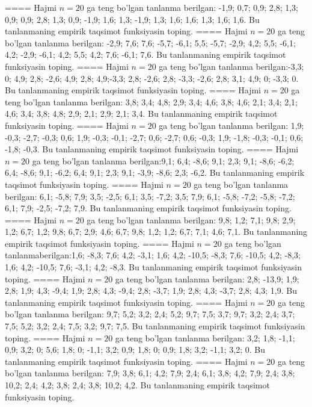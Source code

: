 ====
Hajmi \(n = 20\) ga teng bo'lgan tanlanma berilgan: -1,9; 0,7; 0,9; 2,8; 1,3; 0,9; 0,9; 2,8; 1,3; 0,9; -1,9; 1,6; 1,3; -1,9; 1,3; 1,6; 1,6; 1,3; 1,6; 1,6. Bu tanlanmaning empirik taqsimot funksiyasin toping.
====
Hajmi \(n = 20\) ga teng bo'lgan tanlanma berilgan: -2,9; 7,6; 7,6; -5,7; -6,1; 5,5; -5,7; -2,9; 4,2; 5,5; -6,1; 4,2; -2,9; -6,1; 4,2; 5,5; 4,2; 7,6; -6,1; 7,6. Bu tanlanmaning empirik taqsimot funksiyasin toping.
====
Hajmi \(n = 20\) ga teng bo'lgan tanlanma berilgan:-3,3; 0; 4,9; 2,8; -2,6; 4,9; 2,8; 4,9;-3,3; 2,8; -2,6; 2,8; -3,3; -2,6; 2,8; 3,1; 4,9; 0; -3,3; 0. Bu tanlanmaning empirik taqsimot funksiyasin toping.
====
Hajmi \(n = 20\) ga teng bo'lgan tanlanma berilgan: 3,8; 3,4; 4,8; 2,9; 3,4; 4,6; 3,8; 4,6; 2,1; 3,4; 2,1; 4,6; 3,4; 3,8; 4,8; 2,9; 2,1; 2,9; 2,1; 3,4. Bu tanlanmaning empirik taqsimot funksiyasin toping.
====
Hajmi \(n = 20\) ga teng bo'lgan tanlanma berilgan: 1,9; -0,3; -2,7; -0,3; 0,6; 1,9; -0,3; -0,1; -2,7; 0,6; -2,7; 0,6; -0,3; 1,9; -1,8; -0,3; -0,1; 0,6; -1,8; -0,3. Bu tanlanmaning empirik taqsimot funksiyasin toping.
====
Hajmi \(n = 20\) ga teng bo'lgan tanlanma berilgan:9,1; 6,4; -8,6; 9,1; 2,3; 9,1; -8,6; -6,2; 6,4; -8,6; 9,1; -6,2; 6,4; 9,1; 2,3; 9,1; -3,9; -8,6; 2,3; -6,2. Bu tanlanmaning empirik taqsimot funksiyasin toping.
====
Hajmi \(n = 20\) ga teng bo'lgan tanlanma berilgan: 6,1; -5,8; 7,9; 3,5; -2,5; 6,1; 3,5; -7,2; 3,5; 7,9; 6,1; -5,8; -7,2; -5,8; -7,2; 6,1; 7,9; -2,5; -7,2; 7,9. Bu tanlanmaning empirik taqsimot funksiyasin toping.
====
Hajmi \(n = 20\) ga teng bo'lgan tanlanma berilgan: 9,8; 1,2; 7,1; 9,8; 2,9; 1,2; 6,7; 1,2; 9,8; 6,7; 2,9; 4,6; 6,7; 9,8; 1,2; 1,2; 6,7; 7,1; 4,6; 7,1. Bu tanlanmaning empirik taqsimot funksiyasin toping.
====
Hajmi \(n = 20\) ga teng bo'lgan tanlanmaberilgan:1,6; -8,3; 7,6; 4,2; -3,1; 1,6; 4,2; -10,5; -8,3; 7,6; -10,5; 4,2; -8,3; 1,6; 4,2; -10,5; 7,6; -3,1; 4,2; -8,3. Bu tanlanmaning empirik taqsimot funksiyasin toping.
====
Hajmi \(n = 20\) ga teng bo'lgan tanlanma berilgan: 2,8; -13,9; 1,9; 2,8; 1,9; 4,3; -9,4; 1,9; 2,8; 4,3; -9,4; 2,8; -3,7; 1,9; 2,8; 4,3; -3,7; 2,8; 4,3; 1,9. Bu tanlanmaning empirik taqsimot funksiyasin toping.
====
Hajmi \(n = 20\) ga teng bo'lgan tanlanma berilgan: 9,7; 5,2; 3,2; 2,4; 5,2; 9,7; 7,5; 3,7; 9,7; 3,2; 2,4; 3,7; 7,5; 5,2; 3,2; 2,4; 7,5; 3,2; 9,7; 7,5. Bu tanlanmaning empirik taqsimot funksiyasin toping.
====
Hajmi \(n = 20\) ga teng bo'lgan tanlanma berilgan: 3,2; 1,8; -1,1; 0,9; 3,2; 0; 5,6; 1,8; 0; -1,1; 3,2; 0,9; 1,8; 0; 0,9; 1,8; 3,2; -1,1; 3,2; 0. Bu tanlanmaning empirik taqsimot funksiyasin toping.
====
Hajmi \(n = 20\) ga teng bo'lgan tanlanma berilgan: 7,9; 3,8; 6,1; 4,2; 7,9; 2,4; 6,1; 3,8; 4,2; 7,9; 2,4; 3,8; 10,2; 2,4; 4,2; 3,8; 2,4; 3,8; 10,2; 4,2. Bu tanlanmaning empirik taqsimot funksiyasin toping.
